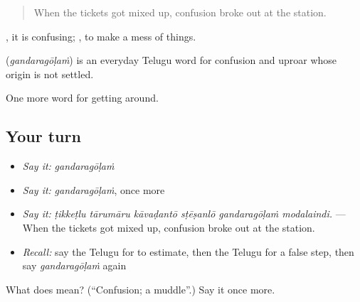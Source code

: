 \begin{quote}
When the tickets got mixed up, confusion broke out at the station.
\end{quote}

 , it is confusing;  , to make a mess of things.

\begin{cousinweb}
\textbf{} (\emph{gandaragōḷaṁ}) is an everyday Telugu word for confusion and uproar whose origin is not settled.
\end{cousinweb}

\begin{grammarlens}[title={What you've built}]
One more word for getting around.
\end{grammarlens}

\subsection*{Your turn}
\begin{itemize}
\raggedright
  \item \emph{Say it:} \emph{gandaragōḷaṁ}
  \item \emph{Say it:} \emph{gandaragōḷaṁ}, once more
  \item \emph{Say it:} \emph{ṭikkeṭlu tārumāru kāvaḍantō sṭēṣanlō gandaragōḷaṁ modalaindi.} — When the tickets got mixed up, confusion broke out at the station.
  \item \emph{Recall:} say the Telugu for to estimate, then the Telugu for a false step, then say \emph{gandaragōḷaṁ} again
\end{itemize}

\begin{tcolorbox}[breakable,colback=teal!4,colframe=teal!35!black,title={Before you move on}]
What does  mean? (\textquotedblleft{}Confusion; a muddle\textquotedblright{}.) Say it once more.
\end{tcolorbox}
